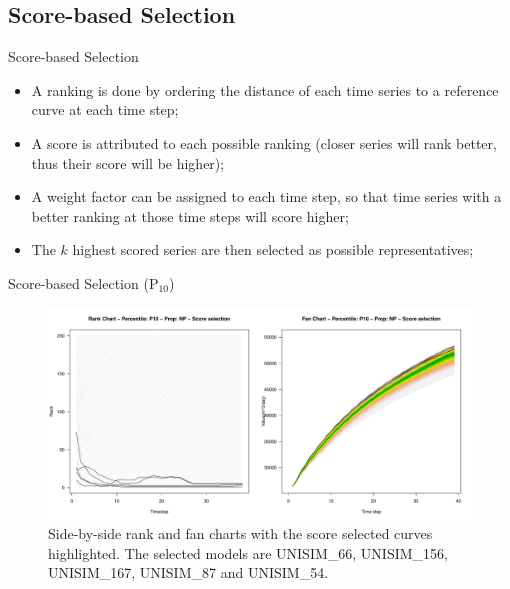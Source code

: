 \documentclass{beamer}
\begin{document}
\subsection{Score-based Selection}
\begin{frame}{Score-based Selection}
  \begin{itemize}
    \item A ranking is done by ordering the distance of each time series to a reference curve at each time step;
    \item A score is attributed to each possible ranking (closer series will rank better, thus their score will be higher);
    \item A weight factor can be assigned to each time step, so that time series with a better ranking at those time steps will score higher;
    \item The $k$ highest scored series are then selected as possible representatives;
  \end{itemize}
\end{frame}

\begin{frame}{Score-based Selection (P$_{10}$)}
  \begin{figure}[H]
    \centering
    \includegraphics[width=0.9\columnwidth]{rank-fan-score-p10.pdf}
    \caption{Side-by-side rank and fan charts with the score selected curves highlighted. The selected models are UNISIM\_66, UNISIM\_156, UNISIM\_167, UNISIM\_87 and UNISIM\_54.}
    \label{fig:rank-fan-score-p10}
  \end{figure}
\end{frame}
\end{document}
